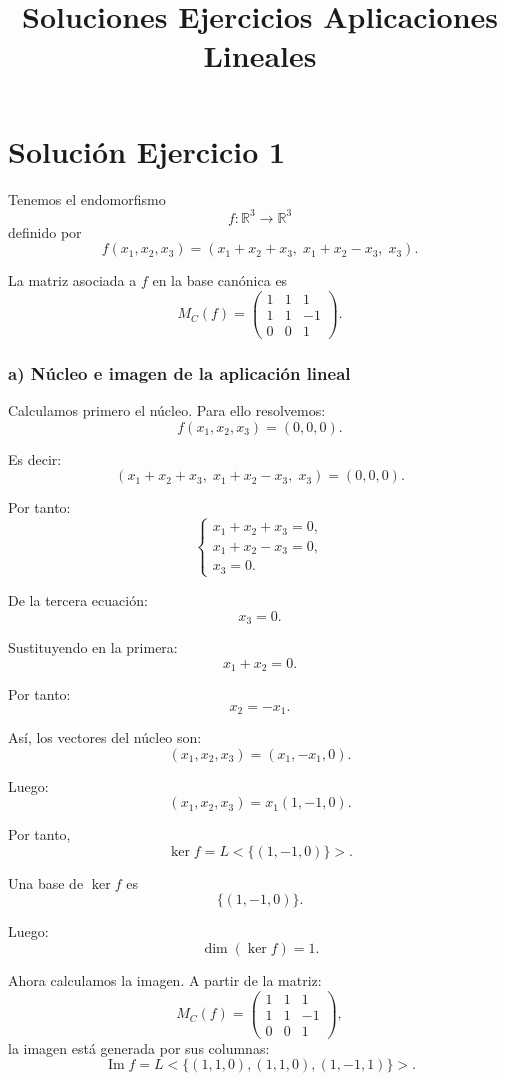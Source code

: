 \documentclass[12pt]{article}
\title{Soluciones Ejercicios Aplicaciones Lineales}
\author{}
\begin{document}
\section*{Solución Ejercicio 1}

Tenemos el endomorfismo
\[
f:\mathbb{R}^3\longrightarrow \mathbb{R}^3
\]
definido por
\[
f(x_1,x_2,x_3)=(x_1+x_2+x_3,\;x_1+x_2-x_3,\;x_3).
\]

La matriz asociada a \(f\) en la base canónica es
\[
M_C(f)=
\begin{pmatrix}
1&1&1\\
1&1&-1\\
0&0&1
\end{pmatrix}.
\]

\subsubsection*{a) Núcleo e imagen de la aplicación lineal}

Calculamos primero el núcleo. Para ello resolvemos:
\[
f(x_1,x_2,x_3)=(0,0,0).
\]

Es decir:
\[
(x_1+x_2+x_3,\;x_1+x_2-x_3,\;x_3)=(0,0,0).
\]

Por tanto:
\[
\begin{cases}
x_1+x_2+x_3=0,\\
x_1+x_2-x_3=0,\\
x_3=0.
\end{cases}
\]

De la tercera ecuación:
\[
x_3=0.
\]

Sustituyendo en la primera:
\[
x_1+x_2=0.
\]

Por tanto:
\[
x_2=-x_1.
\]

Así, los vectores del núcleo son:
\[
(x_1,x_2,x_3)=(x_1,-x_1,0).
\]

Luego:
\[
(x_1,x_2,x_3)=x_1(1,-1,0).
\]

Por tanto,
\[
\ker f=L<\{(1,-1,0)\}>.
\]

Una base de \(\ker f\) es
\[
\boxed{\{(1,-1,0)\}.}
\]

Luego:
\[
\boxed{\dim(\ker f)=1.}
\]

Ahora calculamos la imagen. A partir de la matriz:
\[
M_C(f)=
\begin{pmatrix}
1&1&1\\
1&1&-1\\
0&0&1
\end{pmatrix},
\]
la imagen está generada por sus columnas:
\[
\operatorname{Im} f
=
L<\{(1,1,0),(1,1,0),(1,-1,1)\}>.
\]
\end{document}
